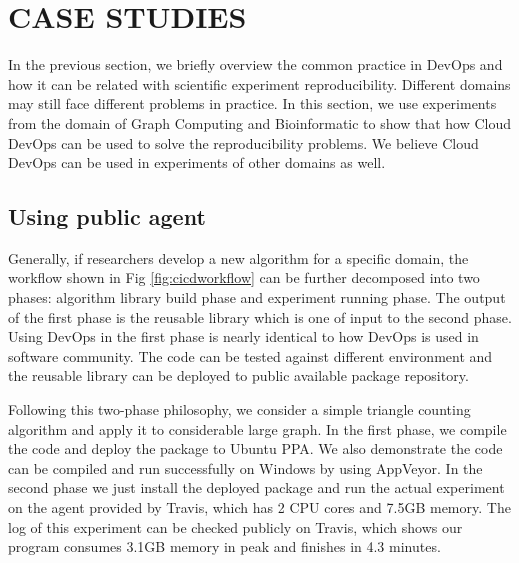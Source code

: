 \documentclass[10pt, conference, compsocconf]{IEEEtran}
\begin{document}
\section{CASE STUDIES}
In the previous section, we briefly overview the common practice in DevOps and how it can be related with scientific experiment reproducibility. Different domains may still face different problems in practice. In this section, we use experiments from the domain of Graph Computing and Bioinformatic to show that how Cloud DevOps can be used to solve the reproducibility problems. We believe Cloud DevOps can be used in experiments of other domains as well. 

\subsection{Using public agent}
Generally, if researchers develop a new algorithm for a specific domain, the workflow shown in Fig \ref{fig:cicdworkflow} can be further decomposed into two phases:
algorithm library build phase and experiment running phase. The output of the first phase is the reusable library which is one of input to the second phase. Using DevOps in the first phase is nearly identical to how DevOps is used in software community.  The code can be tested against different environment and 
the reusable library can be deployed to public available package repository.
 
Following this two-phase philosophy, we consider a simple triangle counting algorithm and apply it to considerable large graph. %
In the first phase, we compile the code and deploy the package to Ubuntu PPA. We also demonstrate the code can be compiled and run successfully on Windows by using AppVeyor. In the second phase we just install the deployed package and run the actual experiment on the agent provided by Travis, which has 2 CPU cores and 7.5GB memory. The log of this experiment can be checked publicly on Travis, which shows
our program consumes 3.1GB memory in peak and finishes in 4.3 minutes. 
\end{document}
